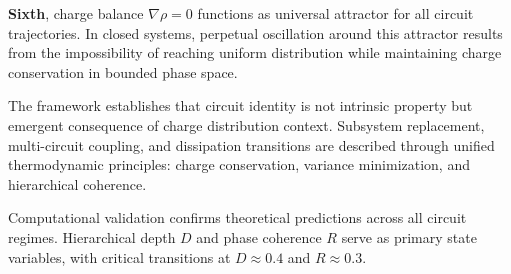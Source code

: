 \documentclass[12pt,a4paper]{article}
\theoremstyle{plain}
\theoremstyle{definition}
\theoremstyle{remark}
\begin{document}
\textbf{Sixth}, charge balance $\nabla \rho = 0$ functions as universal attractor for all circuit trajectories. In closed systems, perpetual oscillation around this attractor results from the impossibility of reaching uniform distribution while maintaining charge conservation in bounded phase space.

The framework establishes that circuit identity is not intrinsic property but emergent consequence of charge distribution context. Subsystem replacement, multi-circuit coupling, and dissipation transitions are described through unified thermodynamic principles: charge conservation, variance minimization, and hierarchical coherence.

Computational validation confirms theoretical predictions across all circuit regimes. Hierarchical depth $D$ and phase coherence $R$ serve as primary state variables, with critical transitions at $D \approx 0.4$ and $R \approx 0.3$.



\end{document}
